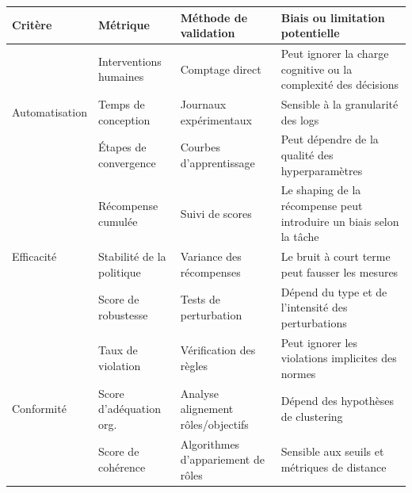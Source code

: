 \begin{table}[h!]
    \centering
    \renewcommand{\arraystretch}{1.3}
    \begin{footnotesize}
        \begin{tabular}{p{1.5cm}p{2.4cm}p{2.2cm}p{4.5cm}}
            \hline
            \textbf{Critère} & \textbf{Métrique}                & \textbf{Méthode de validation}     & \textbf{Biais ou limitation potentielle}                            \\
            \hline
            \multirow{3}{*}{Automatisation}
                             & Interventions humaines           & Comptage direct                    & Peut ignorer la charge cognitive ou la complexité des décisions     \\
                             & Temps de conception              & Journaux expérimentaux             & Sensible à la granularité des logs                                  \\
                             & Étapes de convergence            & Courbes d'apprentissage            & Peut dépendre de la qualité des hyperparamètres                     \\
            \hline
            \multirow{3}{*}{Efficacité}
                             & Récompense cumulée               & Suivi de scores                    & Le shaping de la récompense peut introduire un biais selon la tâche \\
                             & Stabilité de la politique        & Variance des récompenses           & Le bruit à court terme peut fausser les mesures                     \\
                             & Score de robustesse              & Tests de perturbation              & Dépend du type et de l'intensité des perturbations                  \\
            \hline
            \multirow{3}{*}{Conformité}
                             & Taux de violation                & Vérification des règles            & Peut ignorer les violations implicites des normes                   \\
                             & Score d'adéquation org.          & Analyse alignement rôles/objectifs & Dépend des hypothèses de clustering                                 \\
                             & Score de cohérence               & Algorithmes d'appariement de rôles & Sensible aux seuils et métriques de distance                        \\

\end{tabular}
\end{footnotesize}
\end{table}
